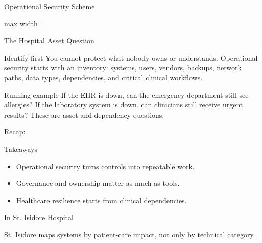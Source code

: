 \documentclass[presentation]{beamer}
\newcommand{\scenario}{St. Isidore Hospital}
\newcommand{\takeawaysframe}[2]{
\begin{frame}[c]{Recap: \insertsection}
\begin{block}{Takeaways}
#1
\end{block}
\begin{exampleblock}{In \scenario}
#2
\end{exampleblock}
\end{frame}
}
\begin{document}
\begin{frame}[c]{Operational Security Scheme}
\begin{center}
\begin{adjustbox}{max width=\textwidth}
\end{adjustbox}
\end{center}
\end{frame}

\begin{frame}[c]{The Hospital Asset Question}
\begin{block}{Identify first}
You cannot protect what nobody owns or understands. Operational security starts with an inventory:
systems, users, vendors, backups, network paths, data types, dependencies, and critical clinical
workflows.
\end{block}

\begin{exampleblock}{Running example}
If the EHR is down, can the emergency department still see allergies? If the laboratory system is
down, can clinicians still receive urgent results? These are asset and dependency questions.
\end{exampleblock}
\end{frame}

\takeawaysframe{
\begin{itemize}
    \item Operational security turns controls into repeatable work.
    \item Governance and ownership matter as much as tools.
    \item Healthcare resilience starts from clinical dependencies.
\end{itemize}
}{
St. Isidore maps systems by patient-care impact, not only by technical category.
}
\end{document}
